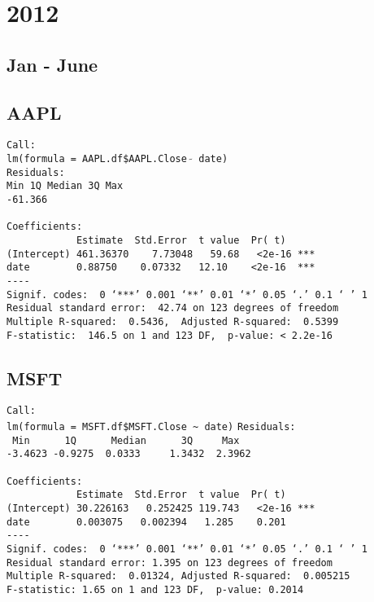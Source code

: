 \documentclass{article}[14pt]
\begin{document}
\section{ 2012}

\subsection{Jan - June}
\subsection{AAPL}
\texttt{Call: \\
lm(formula = AAPL.df\$AAPL.Close $\tilde{}$ date)\\
Residuals:\\
Min \hspace{35pt} 1Q \qquad Median \qquad 3Q \qquad  Max\\
-61.366       \\}
\verb| |\\
\verb|Coefficients:|\\
\verb|            Estimate  Std.Error  t value  Pr( t)|\\
\verb|(Intercept) 461.36370    7.73048   59.68   <2e-16 ***|\\
\verb|date        0.88750    0.07332   12.10    <2e-16  ***|\\
\verb|----|\\
\verb|Signif. codes:  0 ‘***’ 0.001 ‘**’ 0.01 ‘*’ 0.05 ‘.’ 0.1 ‘ ’ 1|\\
\verb|Residual standard error:  42.74 on 123 degrees of freedom|\\
\verb|Multiple R-squared:  0.5436,	Adjusted R-squared:  0.5399 |\\
\verb|F-statistic:  146.5 on 1 and 123 DF,  p-value: < 2.2e-16|

\subsection{MSFT}
\verb|Call:|\\
\verb|lm(formula = MSFT.df$MSFT.Close ~ date)|
\verb|Residuals:|\\
\verb| Min      1Q      Median      3Q     Max |\\
\verb|-3.4623 -0.9275  0.0333     1.3432  2.3962   |\\
\verb| |\\
\verb|Coefficients:|\\
\verb|            Estimate  Std.Error  t value  Pr( t)|\\
\verb|(Intercept) 30.226163   0.252425 119.743   <2e-16 ***|\\
\verb|date        0.003075   0.002394   1.285    0.201|\\
\verb|----|\\
\verb|Signif. codes:  0 ‘***’ 0.001 ‘**’ 0.01 ‘*’ 0.05 ‘.’ 0.1 ‘ ’ 1|\\
\verb|Residual standard error: 1.395 on 123 degrees of freedom|\\
\verb|Multiple R-squared:  0.01324,	Adjusted R-squared:  0.005215|\\
\verb|F-statistic: 1.65 on 1 and 123 DF,  p-value: 0.2014|
\end{document}
